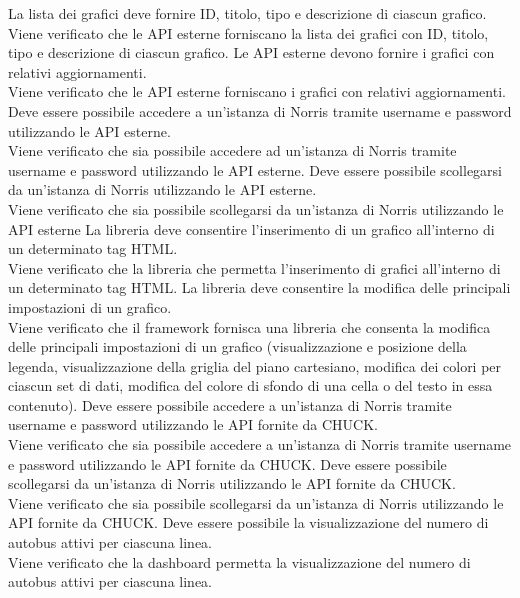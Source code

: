  La lista dei grafici deve fornire ID, titolo, tipo e descrizione di ciascun grafico.\\
Viene verificato che le API esterne forniscano la lista dei grafici con ID, titolo, tipo e descrizione di ciascun grafico.
 Le API esterne devono fornire i grafici con relativi aggiornamenti.\\
Viene verificato che le API esterne forniscano i grafici con relativi aggiornamenti.
 Deve essere possibile accedere a un'istanza di Norris tramite username e password utilizzando le API esterne.\\
Viene verificato che sia possibile accedere ad un'istanza di Norris tramite username e password utilizzando le API esterne.
 Deve essere possibile scollegarsi da un'istanza di Norris utilizzando le API esterne.\\
Viene verificato che sia possibile scollegarsi da un'istanza di Norris utilizzando le API esterne
 La libreria deve consentire l'inserimento di un grafico all'interno di un determinato tag HTML.\\
Viene verificato che la libreria che permetta l'inserimento di grafici all'interno di un determinato tag HTML.
 La libreria deve consentire la modifica delle principali impostazioni di un grafico.\\
Viene verificato che il framework fornisca una libreria che consenta la modifica delle principali impostazioni di un grafico (visualizzazione e posizione della legenda, visualizzazione della griglia del piano cartesiano, modifica dei colori per ciascun set di dati, modifica del colore di sfondo di una cella o del testo in essa contenuto).
 Deve essere possibile accedere a un'istanza di Norris tramite username e password utilizzando le API fornite da CHUCK.\\
Viene verificato che sia possibile accedere a un'istanza di Norris tramite username e password utilizzando le API fornite da CHUCK.
 Deve essere possibile scollegarsi da un'istanza di Norris utilizzando le API fornite da CHUCK.\\
Viene verificato che sia possibile scollegarsi da un'istanza di Norris utilizzando le API fornite da CHUCK.
 Deve essere possibile la visualizzazione del numero di autobus attivi per ciascuna linea.\\
Viene verificato che la dashboard permetta la visualizzazione del numero di autobus attivi per ciascuna linea.
